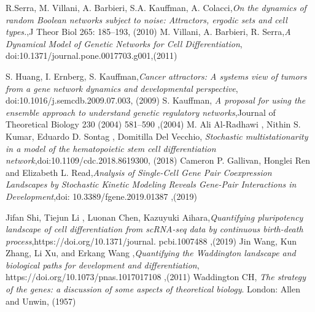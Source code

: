 \begin{thebibliography}{90}
 R.Serra, M. Villani, A. Barbieri, S.A. Kauffman, A. Colacci,\emph{On the dynamics of random Boolean networks subject to noise:
Attractors, ergodic sets and cell types.},J Theor Biol 265: 185–193, (2010)
 M. Villani, A. Barbieri, R. Serra,\emph{A Dynamical Model of Genetic Networks for Cell Differentiation}, doi:10.1371/journal.pone.0017703.g001,(2011)

 S. Huang, I. Ernberg, S. Kauffman,\emph{Cancer attractors: A systems view of tumors from a gene network
dynamics and developmental perspective}, doi:10.1016/j.semcdb.2009.07.003, (2009)
 S. Kauffman, \emph{A proposal for using the ensemble approach to understand
genetic regulatory networks},Journal of Theoretical Biology 230 (2004) 581–590 ,(2004)
 M. Ali Al-Radhawi , Nithin S. Kumar, Eduardo D. Sontag , Domitilla Del Vecchio, \emph{Stochastic multistationarity in a model of the hematopoietic
stem cell differentiation network},doi:10.1109/cdc.2018.8619300, (2018)
 Cameron P. Gallivan, Honglei Ren and Elizabeth L. Read,\emph{Analysis of Single-Cell Gene Pair
Coexpression Landscapes by
Stochastic Kinetic Modeling Reveals
Gene-Pair Interactions in
Development},doi: 10.3389/fgene.2019.01387 ,(2019)

 Jifan Shi, Tiejun Li , Luonan Chen, Kazuyuki Aihara,\emph{Quantifying pluripotency landscape of cell
differentiation from scRNA-seq data by
continuous birth-death process},https://doi.org/10.1371/journal.
pcbi.1007488 ,(2019)
 Jin Wang, Kun Zhang, Li Xu, and Erkang Wang ,\emph{Quantifying the Waddington landscape and biological
paths for development and differentiation}, https://doi.org/10.1073/pnas.1017017108 ,(2011)
 Waddington CH, \emph{The strategy of the genes: a discussion of some aspects of
theoretical biology}. London: Allen and Unwin, (1957)



\end{thebibliography}
